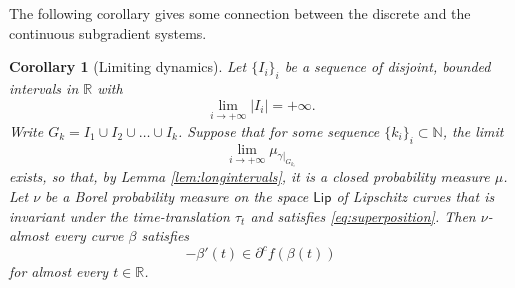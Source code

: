 \documentclass[11pt]{article}
\newtheorem{coro}[thm]{Corollary}
\theoremstyle{definition}
\theoremstyle{remark}
\newcommand{\R}{\mathbb{R}}
\newcommand{\N}{\mathbb{N}}
\newcommand{\lipschitz}{\mathsf{Lip}}
\newcommand{\meas}[2]{\mu_{#1|_{#2}}}
\begin{document}
The following corollary gives some connection between the discrete and the continuous subgradient systems. %

\begin{coro}[Limiting dynamics]\label{cor:discretecontinuous}
 Let $\{I_i\}_i$ be a sequence of disjoint, bounded intervals in $\R$ with
 \[\lim_{i\to+\infty}|I_i|=+\infty.\]
 Write $G_k=I_1\cup I_2\cup\dots \cup I_{k}$.
 Suppose that for some sequence $\{k_i\}_i\subset\N$, the limit \[\lim_{i\to+\infty}\meas{\gamma}{G_{k_i}}\] exists, so that, by Lemma \ref{lem:longintervals}, it is a closed probability measure $\mu$. 
%
 Let $\nu$ be a Borel probability measure on the space $\lipschitz$ of Lipschitz curves that is invariant under the time-translation $\tau_t$ and satisfies \eqref{eq:superposition}. Then $\nu$-almost every curve $\beta$ satisfies
 \[-\beta'(t)\in \partial^cf(\beta(t))\]
 for almost every $t\in\R$.
\end{coro}
\end{document}
